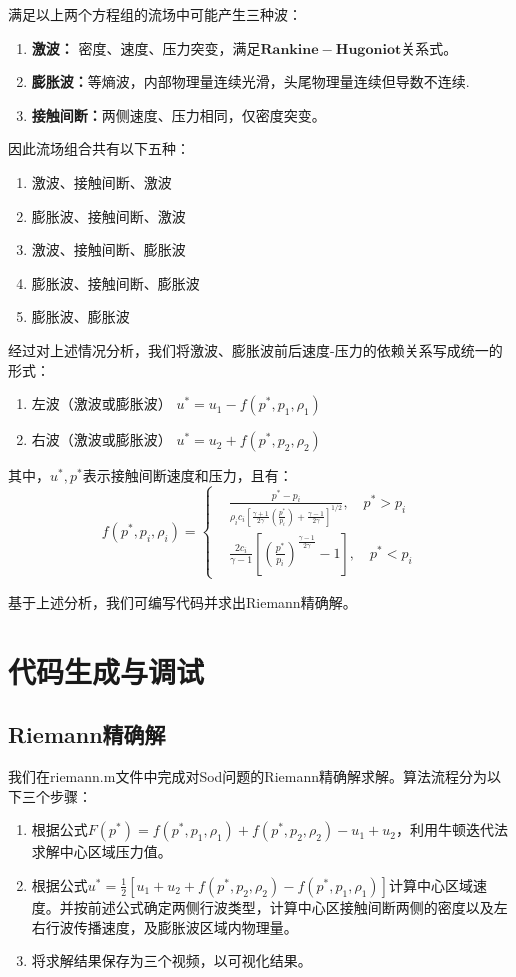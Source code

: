 \documentclass[12pt,a4paper]{article}%
\begin{document}
		 满足以上两个方程组的流场中可能产生三种波：
		 \begin{enumerate}
		 	\item \textbf{激波：} 密度、速度、压力突变，满足$\mathbf{Rankine-Hugoniot}$关系式。
		 	\item \textbf{膨胀波：}等熵波，内部物理量连续光滑，头尾物理量连续但导数不连续.
		 	\item \textbf{接触间断：}两侧速度、压力相同，仅密度突变。
		 \end{enumerate}
		 
		 因此流场组合共有以下五种：
		\begin{enumerate}
			\item 激波、接触间断、激波
			\item 膨胀波、接触间断、激波
			\item 激波、接触间断、膨胀波
			\item 膨胀波、接触间断、膨胀波
			\item 膨胀波、膨胀波
		\end{enumerate}
		 
		 经过对上述情况分析，我们将激波、膨胀波前后速度-压力的依赖关系写成统一的形式：
		 \begin{enumerate}
		 	\item 左波（激波或膨胀波） $u^* = u_1 - f(p^*,p_1,\rho_1)$
		 	\item 右波（激波或膨胀波） $u^* = u_2 + f(p^*,p_2,\rho_2)$
		 \end{enumerate}
		 其中，$u^*,p^*$表示接触间断速度和压力，且有：
		 \[
		 f(p^*,p_i,\rho_i) = 
		 \left\{
		 \begin{aligned}
		 	& \frac{p^* - p_i}{\rho_i c_i[\frac{\gamma+1}{2\gamma} (\frac{p^*}{p_i}) + \frac{\gamma-1}{2\gamma}]^{1/2}},\quad p^*>p_i \\
		 	& \frac{2c_i}{\gamma-1}[(\frac{p^*}{p_i})^{\frac{\gamma-1}{2\gamma}} - 1],\quad p^*<p_i
		 \end{aligned}
		 \right.
		 \]
		 
		 基于上述分析，我们可编写代码并求出Riemann精确解。
		 
	\section{代码生成与调试}
		\subsection{Riemann精确解}
		我们在riemann.m文件中完成对Sod问题的Riemann精确解求解。算法流程分为以下三个步骤：
		\begin{enumerate}
			\item 根据公式$F(p^*) = f(p^*,p_1,\rho_1) + f(p^*,p_2,\rho_2) - u_1 + u_2$，利用牛顿迭代法求解中心区域压力值。
			\item 根据公式$u^* = \frac{1}{2}[u_1 + u_2 + f(p^*,p_2,\rho_2) - f(p^*,p_1,\rho_1)]$计算中心区域速度。并按前述公式确定两侧行波类型，计算中心区接触间断两侧的密度以及左右行波传播速度，及膨胀波区域内物理量。
			\item 将求解结果保存为三个视频，以可视化结果。
		\end{enumerate}
		
\end{document}
